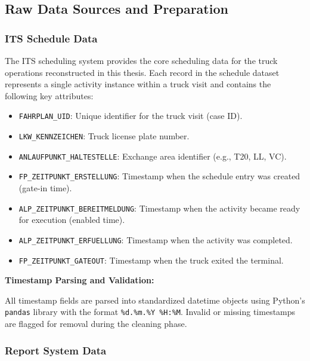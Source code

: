     \subsection{Raw Data Sources and Preparation}

        \subsubsection{ ITS Schedule Data}

        The ITS scheduling system provides the core scheduling data for the truck operations reconstructed in this thesis. Each record in the schedule dataset represents a single activity instance within a truck visit and contains the following key attributes:
        
        \begin{itemize}
            \item \texttt{FAHRPLAN\_UID}: Unique identifier for the truck visit (case ID).
            \item \texttt{LKW\_KENNZEICHEN}: Truck license plate number.
            \item \texttt{ANLAUFPUNKT\_HALTESTELLE}: Exchange area identifier (e.g., T20, LL, VC).
            \item \texttt{FP\_ZEITPUNKT\_ERSTELLUNG}: Timestamp when the schedule entry was created (gate-in time).
            \item \texttt{ALP\_ZEITPUNKT\_BEREITMELDUNG}: Timestamp when the activity became ready for execution (enabled time).
            \item \texttt{ALP\_ZEITPUNKT\_ERFUELLUNG}: Timestamp when the activity was completed.
            \item \texttt{FP\_ZEITPUNKT\_GATEOUT}: Timestamp when the truck exited the terminal.
        \end{itemize}
        
        \textbf{Timestamp Parsing and Validation:}
        
        All timestamp fields are parsed into standardized datetime objects using Python's \texttt{pandas} library with the format \texttt{\%d.\%m.\%Y \%H:\%M}. Invalid or missing timestamps are flagged for removal during the cleaning phase.
    
        
        \subsubsection{Report System Data}

